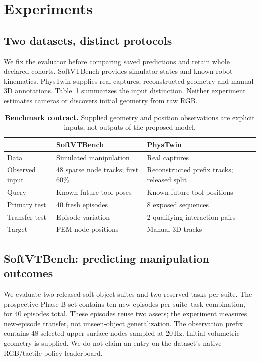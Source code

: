 \documentclass[10pt,twocolumn,letterpaper]{article}
\begin{document}
\section{Experiments}
\subsection{Two datasets, distinct protocols}
We fix the evaluator before comparing saved predictions and retain whole declared cohorts. SoftVTBench provides simulator states and known robot kinematics. PhysTwin supplies real captures, reconstructed geometry and manual 3D annotations. Table~\ref{tab:protocol} summarizes the input distinction. Neither experiment estimates cameras or discovers initial geometry from raw RGB.

\begin{table}[h]
\centering\small\setlength{\tabcolsep}{3pt}
\caption{\textbf{Benchmark contract.} Supplied geometry and position observations are explicit inputs, not outputs of the proposed model.}
\label{tab:protocol}
\begin{tabular}{p{}p{}p{}}\toprule
 & SoftVTBench & PhysTwin\\\midrule
Data & Simulated manipulation & Real captures\\
Observed input & 48 sparse node tracks; first 60\% & Reconstructed prefix tracks; released split\\
Query & Known future tool poses & Known future tool positions\\
Primary test & 40 fresh episodes & 8 exposed sequences\\
Transfer test & Episode variation & 2 qualifying interaction pairs\\
Target & FEM node positions & Manual 3D tracks\\\bottomrule
\end{tabular}
\end{table}

\subsection{SoftVTBench: predicting manipulation outcomes}
We evaluate two released soft-object suites and two reserved tasks per suite. The prospective Phase B set contains ten new episodes per suite--task combination, for 40 episodes total. These episodes reuse two assets; the experiment measures new-episode transfer, not unseen-object generalization. The observation prefix contains 48 selected upper-surface nodes sampled at 20\,Hz. Initial volumetric geometry is supplied. We do not claim an entry on the dataset's native RGB/tactile policy leaderboard.
\end{document}
